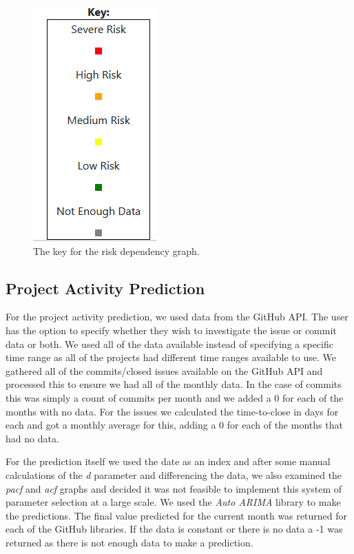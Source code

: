 \documentclass[conference]{IEEEtran}
\begin{document}
\begin{figure}[H]
\begin{center}
    \includegraphics[scale=0.5]{Key.png}
    \caption{The key for the risk dependency graph.}
    \label{fig:key}
\end{center}
\end{figure}

\subsection{Project Activity Prediction}
For the project activity prediction, we used data from the GitHub API. The user has the option to specify whether they wish to investigate the issue or commit data or both. We used all of the data available instead of specifying a specific time range as all of the projects had different time ranges available to use. We gathered all of the commits/closed issues available on the GitHub API and processed this to ensure we had all of the monthly data. In the case of commits this was simply a count of commits per month and we added a 0 for each of the months with no data. For the issues we calculated the time-to-close in days for each and got a monthly average for this, adding a 0 for each of the months that had no data. 

For the prediction itself we used the date as an index and after some manual calculations of the \textit{d} parameter and differencing the data, we also examined the \textit{pacf} and \textit{acf} graphs and decided it was not feasible to implement this system of parameter selection at a large scale. We used the \textit{Auto ARIMA} library to make the predictions. The final value predicted for the current month was returned for each of the GitHub libraries. If the data is constant or there is no data a -1 was returned as there is not enough data to make a prediction. 
\end{document}
